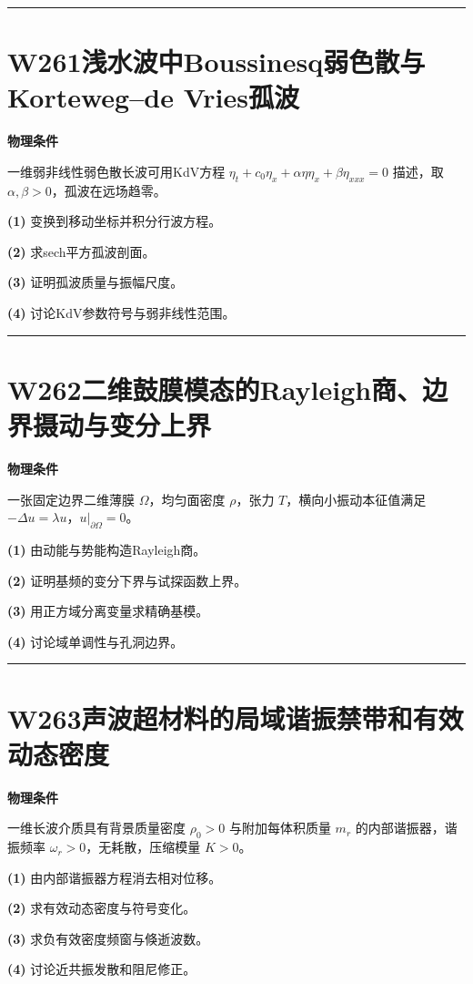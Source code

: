 \documentclass[UTF8,a4paper,11pt,oneside,openany]{ctexbook}
\begin{document}
\par\bigskip\hrule\bigskip
\section*{W261\quad 浅水波中Boussinesq弱色散与Korteweg–de Vries孤波}
\textbf{物理条件}\par 一维弱非线性弱色散长波可用KdV方程 \(\eta_t+c_0\eta_x+\alpha\eta\eta_x+\beta\eta_{xxx}=0\) 描述，取 \(\alpha,\beta>0\)，孤波在远场趋零。
\par\noindent\textbf{(1)} 变换到移动坐标并积分行波方程。
\par\noindent\textbf{(2)} 求sech平方孤波剖面。
\par\noindent\textbf{(3)} 证明孤波质量与振幅尺度。
\par\noindent\textbf{(4)} 讨论KdV参数符号与弱非线性范围。

\par\bigskip\hrule\bigskip
\section*{W262\quad 二维鼓膜模态的Rayleigh商、边界摄动与变分上界}
\textbf{物理条件}\par 一张固定边界二维薄膜 \(\Omega\)，均匀面密度 \(\rho\)，张力 \(T\)，横向小振动本征值满足 \(-\Delta u=\lambda u\)，\(u|_{\partial\Omega}=0\)。
\par\noindent\textbf{(1)} 由动能与势能构造Rayleigh商。
\par\noindent\textbf{(2)} 证明基频的变分下界与试探函数上界。
\par\noindent\textbf{(3)} 用正方域分离变量求精确基模。
\par\noindent\textbf{(4)} 讨论域单调性与孔洞边界。

\par\bigskip\hrule\bigskip
\section*{W263\quad 声波超材料的局域谐振禁带和有效动态密度}
\textbf{物理条件}\par 一维长波介质具有背景质量密度 \(\rho_0>0\) 与附加每体积质量 \(m_r\) 的内部谐振器，谐振频率 \(\omega_r>0\)，无耗散，压缩模量 \(K>0\)。
\par\noindent\textbf{(1)} 由内部谐振器方程消去相对位移。
\par\noindent\textbf{(2)} 求有效动态密度与符号变化。
\par\noindent\textbf{(3)} 求负有效密度频窗与倏逝波数。
\par\noindent\textbf{(4)} 讨论近共振发散和阻尼修正。
\end{document}
